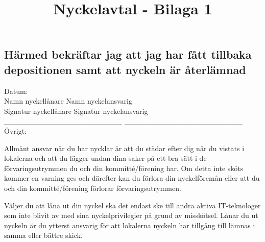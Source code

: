 \documentclass[11pt, noincludeaddress, nopagination]{classes/cthit}
\begin{document}
\newpage

\subsection*{Härmed bekräftar jag att jag har fått tillbaka depositionen samt att nyckeln är återlämnad}
\vspace{1cm}
Datum:
\vspace{2cm} \\
Namn nyckellånare
\hspace{4.7cm}
Namn nyckelansvarig
\vspace{2cm} \\
Signatur nyckellånare
\hspace{4.3cm}
Signatur nyckelansvarig
\vspace{1cm}\\
\_\_\_\_\_\_\_\_\_\_\_\_\_\_\_\_\_\_\_\_\_\_ \hspace{1.5 cm} \_\_\_\_\_\_\_\_\_\_\_\_\_\_\_\_\_\_\_\_\_\_
\vspace{5cm} \\
Övrigt:

\newpage
\title{Nyckelavtal - Bilaga 1}

\makesimpletitle
\vspace{-2 cm}
Allmänt ansvar när du har nycklar är att du städar efter dig när du vistats i lokalerna och att du lägger undan dina saker på ett bra sätt i de förvaringsutrymmen du och din kommitté/förening har. Om detta inte sköts kommer en varning ges och därefter kan du förlora din nyckelföremån eller att du och din kommitté/förening förlorar förvaringsutrymmen.

Väljer du att låna ut din nyckel ska det endast ske till andra aktiva IT-teknologer som inte blivit av med sina nyckelprivilegier på grund av misskötsel. Lånar du ut nyckeln är du ytterst ansvarig för att lokalerna nyckeln har tillgång till lämnas i samma eller bättre skick.
\end{document}
